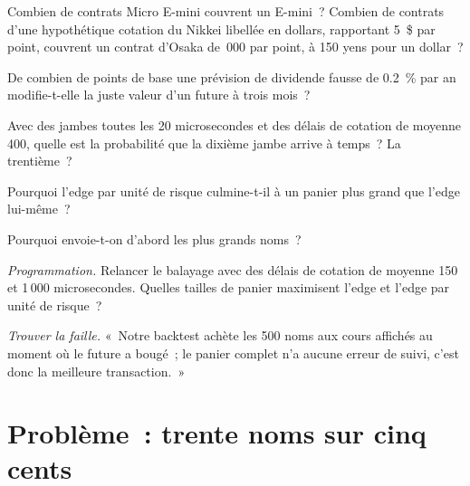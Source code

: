 \begin{exercise}[$\star$]\label{exo:hf:index-and-basket-arbitrage:2}
Combien de contrats Micro E-mini couvrent un E-mini~? Combien de contrats d'une hypothétique cotation du Nikkei libellée en dollars, rapportant 5~\$ par point, couvrent un contrat d'Osaka de
\,000 par point, à 150 yens pour un dollar~?
\end{exercise}

\begin{exercise}[$\star$]\label{exo:hf:index-and-basket-arbitrage:3}
De combien de points de base une prévision de dividende fausse de 0.2~\% par an modifie-t-elle la juste valeur d'un future à trois mois~?
\end{exercise}

\begin{exercise}[$\star\star$]\label{exo:hf:index-and-basket-arbitrage:4}
Avec des jambes toutes les 20 microsecondes et des délais de cotation de moyenne 400, quelle est la probabilité que la dixième jambe arrive à temps~? La trentième~?
\end{exercise}

\begin{exercise}[$\star\star$]\label{exo:hf:index-and-basket-arbitrage:5}
Pourquoi l'edge par unité de risque culmine-t-il à un panier plus grand que l'edge lui-même~?
\end{exercise}

\begin{exercise}[$\star\star$]\label{exo:hf:index-and-basket-arbitrage:6}
Pourquoi envoie-t-on d'abord les plus grands noms~?
\end{exercise}

\begin{exercise}[$\star\star\star$]\label{exo:hf:index-and-basket-arbitrage:7}
\emph{Programmation.} Relancer le balayage avec des délais de cotation de moyenne 150 et 1\,000 microsecondes. Quelles tailles de panier maximisent l'edge et l'edge par unité de
risque~?
\end{exercise}

\begin{exercise}[$\star\star\star$]\label{exo:hf:index-and-basket-arbitrage:8}
\emph{Trouver la faille.} «~Notre backtest achète les 500 noms aux cours affichés au moment où le future a bougé~; le panier complet n'a aucune erreur de suivi, c'est donc
la meilleure transaction.~»
\end{exercise}

\section{Problème~: trente noms sur cinq cents}

